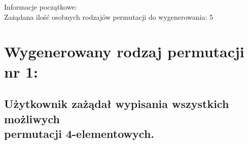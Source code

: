\documentclass[12pt]{article}
\begin{document}
 
\begin{flushleft}
Informacje początkowe:\\[\baselineskip]
Zażądana ilość osobnych rodzajów permutacji do wygenerowania: 5
\end{flushleft}
\hfill
\section{Wygenerowany rodzaj permutacji nr 1:}
\subsection*{Użytkownik zażądał wypisania wszystkich możliwych\\ permutacji 4-elementowych.}

\subsection{}
\end{document}
